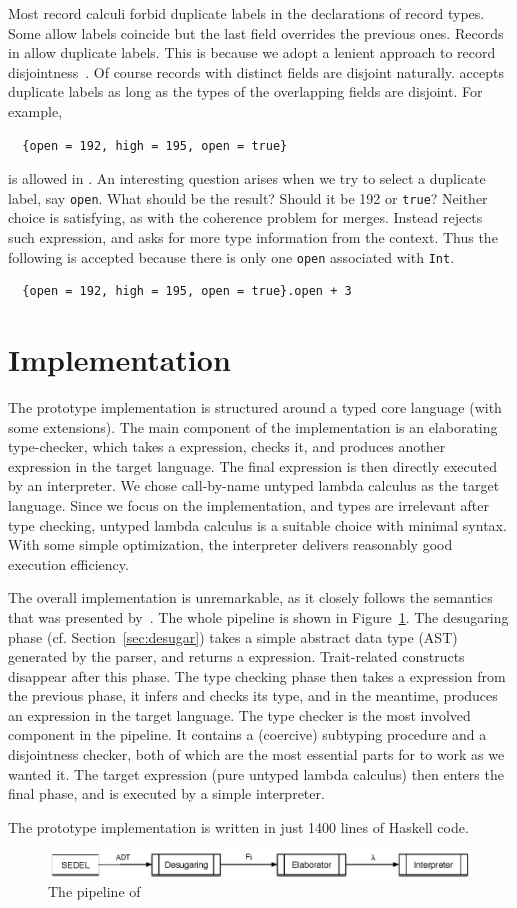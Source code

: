 Most record calculi forbid duplicate labels in the declarations of record types.
Some allow labels coincide but the last field overrides the previous ones.
Records in \name allow duplicate labels. This is because we adopt a lenient
approach to record disjointness~\cite{alpuimdisjoint}. Of course records with
distinct fields are disjoint naturally. \name accepts duplicate labels as long
as the types of the overlapping fields are disjoint. For example,
\begin{lstlisting}
  {open = 192, high = 195, open = true}
\end{lstlisting}
is allowed in \name. An interesting question arises when we try to select a
duplicate label, say \lstinline{open}. What should be the result? Should it be
192 or \lstinline{true}? Neither choice is satisfying, as with the coherence
problem for merges. Instead \name rejects such expression, and asks for more
type information from the context. Thus the following is accepted because there
is only one \lstinline{open} associated with \lstinline{Int}.
\begin{lstlisting}
  {open = 192, high = 195, open = true}.open + 3
\end{lstlisting}

\section{Implementation}

The \name prototype implementation is structured around a typed core language
(\bname with some extensions). The main component of the implementation is an
elaborating type-checker, which takes a \bname expression, checks it, and
produces another expression in the target language. The final expression is then
directly executed by an interpreter. We chose call-by-name untyped lambda
calculus as the target language. Since we focus on the implementation, and types
are irrelevant after type checking, untyped lambda calculus is a suitable choice
with minimal syntax. With some simple optimization, the interpreter delivers
reasonably good execution efficiency.

The overall implementation is unremarkable, as it closely follows the semantics
that was presented by~\citet{alpuimdisjoint}. The whole pipeline is shown in
Figure~\ref{fig:pipeline}. The desugaring phase (cf. Section~\ref{sec:desugar})
takes a simple abstract data type (AST) generated by the parser, and returns a
\bname expression. Trait-related constructs disappear after this phase. The
type checking phase then takes a \bname expression from the previous phase, it
infers and checks its type, and in the meantime, produces an expression in the
target language. The type checker is the most involved component in the
pipeline. It contains a (coercive) subtyping procedure and a disjointness
checker, both of which are the most essential parts for \name to work as we
wanted it. The target expression (pure untyped lambda calculus) then enters the
final phase, and is executed by a simple interpreter.

The prototype implementation is written in just 1400 lines of Haskell code.

\begin{figure}
  \centering
  \includegraphics[scale=0.9]{pipeline.eps}
  \caption{The pipeline of \name}
  \label{fig:pipeline}
\end{figure}